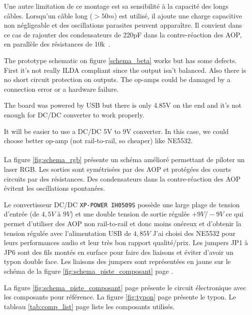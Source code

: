 \begin{appendices}
\begin{fr}
Une autre limitation de ce montage est sa sensibilité à la capacité des longs câbles.
Lorsqu'un câble long ($> 50\unit{m}$) est utilisé, il ajoute une charge capacitive non négligeable et des oscillations parasites peuvent apparaître.
Il convient dans ce cas de rajouter des condensateurs de 220\unit{pF} dans la contre-réaction des AOP, en parallèle des résistances de 10\unit{k\Omega}.
\end{fr}

\begin{en}
The prototype schematic on figure  \ref{schema_beta} works but has some defects.
First it's not really ILDA compliant since the output isn't balanced.
Also there is no short circuit protection on outputs.
The op-amps could be damaged by a connection error or a hardware failure.

The board was powered by USB but there is only 4.85\unit{V} on the end and it's not enough for DC/DC converter to work properly.

It will be easier to use a DC/DC 5\unit{V} to 9\unit{V} converter.
In this case, we could choose better op-amp (not rail-to-rail, so cheaper) like NE5532.
\end{en}

\begin{fr}
\paragraph*{}
La figure \ref{fig:schema_rgb} présente un schéma amélioré permettant de piloter un laser RGB.
Les sorties sont symétrisées par des AOP et protégées des courts circuits par des résistances.
Des condensateurs dans la contre-réaction des AOP évitent les oscillations spontanées.


Le convertisseur DC/DC \texttt{XP-POWER IH0509S} possède une large plage de tension d'entrée (de $4,5\unit{V}$ à $9\unit{V}$) et une double tension de sortie régulée $+9\unit{V}/-9\unit{V}$ ce qui permet d'utiliser des AOP non rail-to-rail et donc moins onéreux et d'obtenir la tension régulée avec l'alimentation USB de $4,85\unit{V}$
J'ai choisi des NE5532 pour leurs performances audio et leur très bon rapport qualité/prix.
Les jumpers JP1 à JP6 sont des fils montés en surface pour faire des liaisons et éviter d'avoir un typon double face.
Les liaisons des jumpers sont représentées en jaune sur le schéma de la figure \ref{fig:schema_piste_composant} page \pageref{fig:schema_piste_composant}.

La figure \ref{fig:schema_piste_composant} page \pageref{fig:schema_piste_composant} présente le circuit électronique avec les composants pour référence.
La figure \ref{fig:typon} page \pageref{fig:typon} présente le typon.
Le tableau \ref{tab:comp_list} page \pageref{tab:comp_list} liste les composants utilisés.
\end{fr}


\end{appendices}
